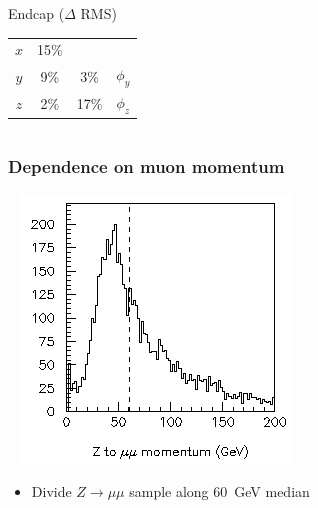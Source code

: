 \documentclass[compress]{beamer}
\begin{document}
\begin{frame}
\begin{columns}
\begin{center}
\vspace{0.5 cm}
Endcap ($\Delta$ RMS)

\vspace{0.05 cm}
\renewcommand{\arraystretch}{1.2}
\begin{tabular}{c c | c c}
\hline\hline
$x$ & 15\% & & \\
$y$ & 9\% & 3\% & $\phi_y$ \\
$z$ & 2\% & 17\% & $\phi_z$ \\
\hline\hline
\end{tabular}
\end{center}
\end{columns}
\end{frame}

\begin{frame}
\frametitle{Dependence on muon momentum}

\vspace{-1 cm}
\mbox{ } \hfill \includegraphics[width=2 cm]{p_distribution.png}

\vspace{-1.3 cm}
\begin{itemize}
\item Divide $Z\to\mu\mu$ sample along 60~GeV median
\end{itemize}


\end{frame}
\end{document}
